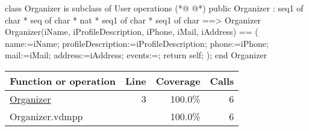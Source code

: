 \begin{vdmpp}[breaklines=true]
class Organizer  is subclass of User 
operations
(*@
\label{Organizer:3}
@*)
  public  Organizer : seq1 of char * seq of char * nat * seq1 of char * seq1 of char  ==> Organizer
  Organizer(iName, iProfileDescription, iPhone, iMail, iAddress) == (
   name:=iName;
   profileDescription:=iProfileDescription;
   phone:=iPhone;
   mail:=iMail;
   address:=iAddress;
   events:={};
   return self;
  );
end Organizer
\end{vdmpp}
\bigskip
\begin{longtable}{|l|r|r|r|}
\hline
Function or operation & Line & Coverage & Calls \\
\hline
\hline
\hyperref[Organizer:3]{Organizer} & 3&100.0\% & 6 \\
\hline
\hline
Organizer.vdmpp & & 100.0\% & 6 \\
\hline
\end{longtable}

